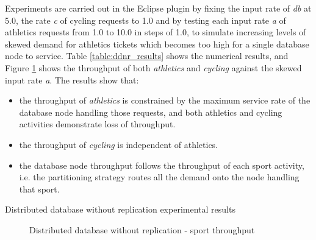 \documentclass[runningheads]{llncs}
\begin{document}
\FloatBarrier
Experiments are carried out in the Eclipse plugin by fixing the input rate of {\itshape db} at 5.0, the rate {\itshape c} of cycling requests to 1.0 and by testing each input rate {\itshape a} of athletics requests from 1.0 to 10.0 in steps of 1.0, to simulate increasing levels of skewed demand for athletics tickets which becomes too high for a single database node to service.  Table \ref{table:ddnr_results} shows the numerical results, and Figure \ref{figure:ddnr_sport} shows the throughput of both {\itshape athletics} and {\itshape cycling} against the skewed input rate {\itshape a}.
The results show that:
\begin{itemize}
	\item the throughput of {\itshape athletics} is constrained by the maximum service rate of the database node handling those requests, and both athletics and cycling activities demonstrate loss of throughput.
	\item the throughput of {\itshape cycling} is independent of athletics.
	\item the database node throughput follows the throughput of each sport activity, i.e. the partitioning strategy routes all the demand onto the node handling that sport.
\end{itemize}

\begin{table}[h!]
	\centering
	\caption{Distributed database without replication experimental results}
	\label{table:ddnr_results}
\end{table}

\begin{figure}
	\centering
	\caption{Distributed database without replication - sport throughput}
	\label{figure:ddnr_sport}
\end{figure}
\end{document}
